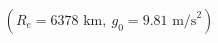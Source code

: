 \documentclass[preview]{standalone}
\begin{document}
\begin{align*}
(R_e = 6378 \text{ km},\ g_0 = 9.81 \text{ m/s}^2)
\end{align*}
\end{document}
